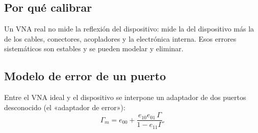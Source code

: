 \subsection{Por qué calibrar}
Un VNA real no mide la reflexión del dispositivo: mide la del dispositivo más la de los cables, conectores, acopladores y la
electrónica interna. Esos errores sistemáticos son estables y se pueden modelar y eliminar.

\subsection{Modelo de error de un puerto}
Entre el VNA ideal y el dispositivo se interpone un adaptador de dos puertos desconocido (el «adaptador de error»):
\begin{equation}
  \Gamma_m = e_{00} + \frac{e_{10}e_{01}\,\Gamma}{1 - e_{11}\Gamma}.
\end{equation}
\begin{donde}
\end{donde}

